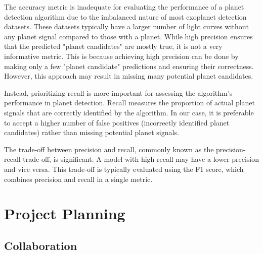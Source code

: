 \documentclass{article}
\begin{document}
The accuracy metric is inadequate for evaluating the performance of a planet detection algorithm due to the imbalanced nature of most exoplanet detection datasets. These datasets typically have a larger number of light curves without any planet signal compared to those with a planet. While high precision ensures that the predicted "planet candidates" are mostly true, it is not a very informative metric. This is because achieving high precision can be done by making only a few "planet candidate" predictions and ensuring their correctness. However, this approach may result in missing many potential planet candidates.

Instead, prioritizing recall is more important for assessing the algorithm's performance in planet detection. Recall measures the proportion of actual planet signals that are correctly identified by the algorithm. In our case, it is preferable to accept a higher number of false positives (incorrectly identified planet candidates) rather than missing potential planet signals.

The trade-off between precision and recall, commonly known as the precision-recall trade-off, is significant. A model with high recall may have a lower precision and vice versa. This trade-off is typically evaluated using the F1 score, which combines precision and recall in a single metric.


\section{Project Planning}

\subsection{Collaboration}

\end{document}
